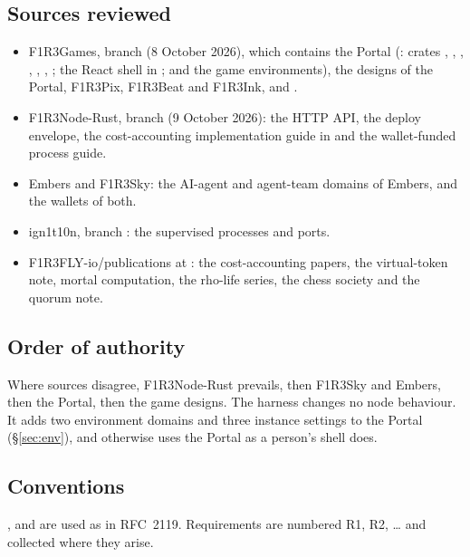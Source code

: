 \documentclass[11pt,a4paper]{article}
\begin{document}
\subsection{Sources reviewed}

\begin{itemize}[itemsep=1pt]
\item F1R3Games, branch  (8 October 2026), which contains the Portal
  (: crates , , , ,
  , , ; the React shell in ; 
  and the game environments), the designs of the Portal, F1R3Pix, F1R3Beat and F1R3Ink, and
  .
\item F1R3Node-Rust, branch  (9 October 2026): the HTTP
  API, the deploy envelope, the cost-accounting implementation guide
  in  and the wallet-funded process guide.
\item Embers and F1R3Sky: the AI-agent and agent-team domains of Embers, and the wallets of both.
\item ign1t10n, branch : the supervised processes and ports.
\item F1R3FLY-io/publications at : the cost-accounting papers, the virtual-token
  note, mortal computation, the rho-life series, the chess society and the quorum note.
\end{itemize}

\subsection{Order of authority}

Where sources disagree, F1R3Node-Rust prevails, then F1R3Sky and Embers, then the Portal, then
the game designs. The harness changes no node behaviour. It adds two environment domains and three
instance settings to the Portal (\S\ref{sec:env}), and otherwise uses the Portal as a person's
shell does.

\subsection{Conventions}

\MUST, \SHOULD{} and \MAY{} are used as in RFC~2119. Requirements are numbered R1, R2, \dots{} and
collected where they arise.

\end{document}
